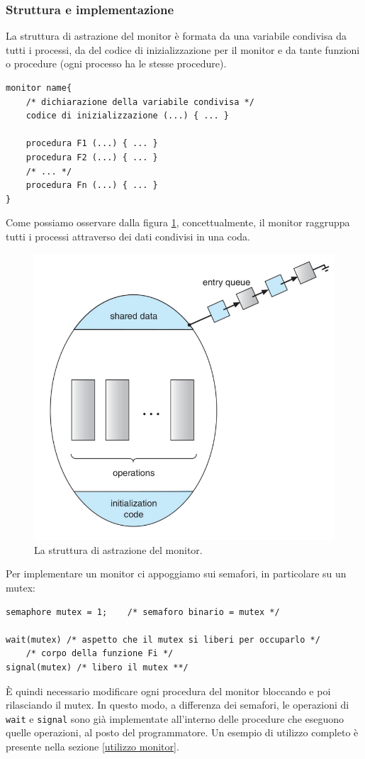 \subsubsection{Struttura e implementazione}
La struttura di astrazione del monitor è formata da una variabile condivisa da tutti i processi, da del codice di inizializzazione per il monitor e da tante funzioni o procedure (ogni processo ha le stesse procedure).
\begin{lstlisting}[caption={Struttura del monitor}]
monitor name{
    /* dichiarazione della variabile condivisa */
    codice di inizializzazione (...) { ... }

    procedura F1 (...) { ... }
    procedura F2 (...) { ... }
    /* ... */ 
    procedura Fn (...) { ... }    
}
\end{lstlisting}
Come possiamo osservare dalla figura \ref{fig:monitor}, concettualmente, il monitor raggruppa tutti i processi attraverso dei dati condivisi in una coda.
\begin{figure}[!h]
    \centering
    \includegraphics[width=.55\textwidth]{../res/imgs/synchronization/monitor.png}
    \caption{La struttura di astrazione del monitor.}
    \label{fig:monitor}
\end{figure}

Per implementare un monitor ci appoggiamo sui semafori, in particolare su un mutex:
\begin{lstlisting}
semaphore mutex = 1;    /* semaforo binario = mutex */

wait(mutex) /* aspetto che il mutex si liberi per occuparlo */
    /* corpo della funzione Fi */
signal(mutex) /* libero il mutex **/
\end{lstlisting}
È quindi necessario modificare ogni procedura del monitor bloccando e poi rilasciando il mutex. In questo modo, a differenza dei semafori, le operazioni di \texttt{wait} e \texttt{signal} sono già implementate all'interno delle procedure che eseguono quelle operazioni, al posto del programmatore. Un esempio di utilizzo completo è presente nella sezione \ref{utilizzo monitor}.

